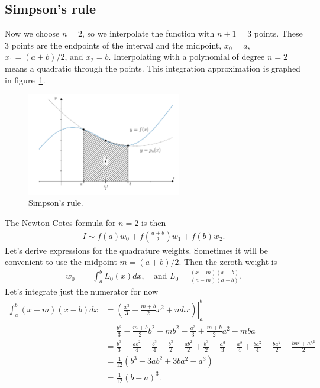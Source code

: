 \subsection{Simpson's rule}
Now we choose $n=2$, so we interpolate the function with $n+1=3$ points. These 3 points are the endpoints of the interval and the midpoint, $x_0=a$, $x_1=(a+b)/2$, and $x_2=b$. Interpolating with a polynomial of degree $n=2$ means a quadratic through the points. This integration approximation is graphed in figure~\ref{fig:ch5_simpsons}.
\begin{figure}[H]
	\begin{center}
	\includegraphics[width=0.6\textwidth]{figures/ch5_simpsons.pdf} 
	  \caption{Simpson's rule.} \label{fig:ch5_simpsons}
	\end{center}
\end{figure}
The Newton-Cotes formula for $n=2$ is then
\begin{align*}
I \sim f(a) w_0 + f(\frac{a+b}{2}) w_1 + f(b) w_2.
\end{align*}
Let's derive expressions for the quadrature weights. Sometimes it will be convenient to use the midpoint $m=(a+b)/2$. Then the zeroth weight is
\begin{align*}
w_0 &= \int_a^b L_0(x) dx, \quad \text{and } L_0 = \frac{(x-m)(x-b)}{(a-m)(a-b)}.
\end{align*}
Let's integrate just the numerator for now
\begin{align*}
\int_a^b (x-m)(x-b) dx &= \left.\left( \frac{x^3}{3} - \frac{m+b}{2}x^2 + mbx \right) \right|_a^b \\
&=  \frac{b^3}{3} - \frac{m+b}{2}b^2 + mb^2  -  \frac{a^3}{3} + \frac{m+b}{2}a^2 - mba  \\
&=  \frac{b^3}{3} - \frac{ab^2}{4}  - \frac{b^3}{4} - \frac{b^3}{2} +  \frac{ab^2}{2} +  \frac{b^3}{2} -  \frac{a^3}{3} + \frac{a^3}{4} + \frac{ba^2}{4} + \frac{ba^2}{2} -  \frac{ba^2+ab^2}{2} \\
&= \frac{1}{12}\left(b^3 - 3ab^2 + 3ba^2 - a^3\right) \\
&= \frac{1}{12}\left(b - a\right)^3.
\end{align*}
